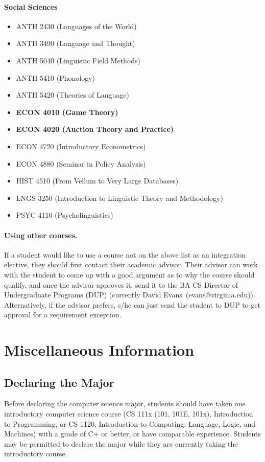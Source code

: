 \documentclass[10pt,letter]{book}
\makeatletter
\newenvironment{itemlist}{
\begin{itemize}
\setlength{\itemsep}{0pt}
\setlength{\parskip}{0pt}}
{\end{itemize}}
\newcommand{\badup}{David Evans}
\newcommand{\badupemail}{evans@virginia.edu}
\newcommand{\mysection}[1]{\section{#1}\renewcommand{\rightmark}{#1}}
\makeatother
\begin{document}
\paragraph{Social Sciences}
\begin{itemlist}
\item ANTH 2430 (Languages of the World)
\item ANTH 3490 (Language and Thought)
\item ANTH 5040 (Linguistic Field Methods)
\item ANTH 5410 (Phonology)
\item ANTH 5420 (Theories of Language)
\item {\bf ECON 4010 (Game Theory)}
\item {\bf ECON 4020 (Auction Theory and Practice)}
\item ECON 4720 (Introductory Econometrics)
\item ECON 4880 (Seminar in Policy Analysis)
\item HIST 4510 (From Vellum to Very Large Databases)
\item LNGS 3250 (Introduction to Linguistic Theory and Methodology)
\item PSYC 4110 (Psycholinguistics)
\end{itemlist}

\paragraph{Using other courses.}  If a student would like to use a
course not on the above list as an integration elective, they should
first contact their academic advisor.  Their advisor can work with the
student to come up with a good argument as to why the course should
qualify, and once the advisor approves it, send it to the BA CS
Director of Undergraduate Programs (DUP) (currently
\badup\ (\badupemail)).  Alternatively, if the advisor prefers, s/he
can just send the student to DUP to get approval for a requirement
exception.

\mysection{Miscellaneous Information}

\subsection{Declaring the Major}

Before declaring the computer science major, students should have
taken one introductory computer science course (CS 111x (101, 101E,
101x), Introduction to Programming, or CS 1120, Introduction to
Computing: Language, Logic, and Machines) with a grade of C+ or
better, or have comparable experience. Students may be permitted to
declare the major while they are currently taking the introductory
course.
\end{document}
